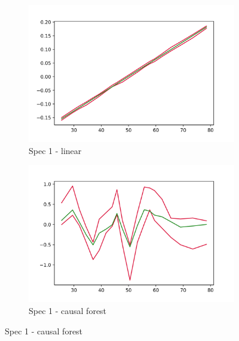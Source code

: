 \begin{figure}[h]
    \centering
    \begin{subfigure}{0.5\linewidth}
        \includegraphics[width=\linewidth]{figures/ALE/chSNDexp/spec1_linear_AGE.png}
        \caption{Spec 1 - linear}
    \end{subfigure}%
    \begin{subfigure}{0.5\linewidth}
        \includegraphics[width=\linewidth]{figures/ALE/chSNDexp/spec1_cf_AGE.png}
        \caption{Spec 1 - causal forest}
    \end{subfigure}


\end{figure}
